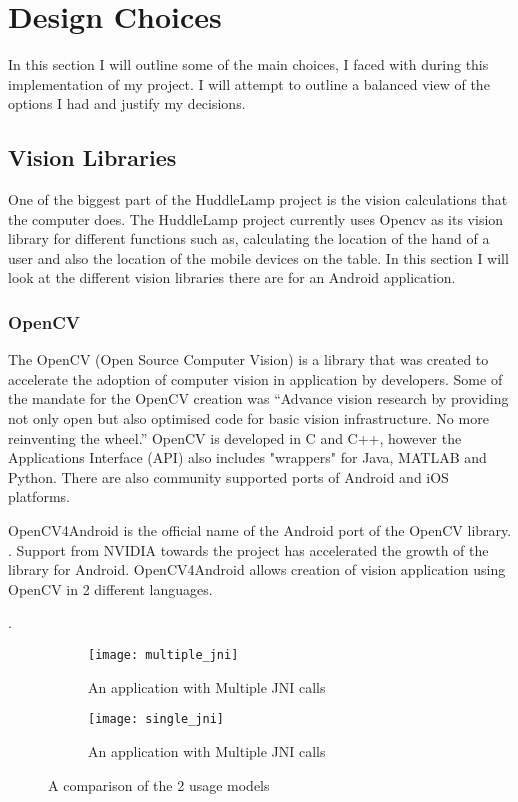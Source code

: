 
 
\section{Design Choices} \label{design_choice_android_camera}
In this section I will outline some of the main choices, I faced with during this implementation of my project. I will attempt to outline a balanced view of the options I had and justify my decisions.
 
\subsection{Vision Libraries}
One of the biggest part of the HuddleLamp project is the vision calculations that the computer does. The HuddleLamp project currently uses Opencv as its vision library for different functions such as, calculating the location of the hand of a user and also the location of the mobile devices on the table. In this section I will look at the different vision libraries there are for an Android application.
 
\subsubsection{OpenCV}
The OpenCV (Open Source Computer Vision) is a library that was created to accelerate the adoption of computer vision in application by developers. Some of the mandate for the OpenCV creation was “Advance vision research by providing not only open but also optimised code for basic vision infrastructure. No more reinventing the wheel.”
\cite{opencv_wiki} 
OpenCV is developed in C and C++, however the Applications Interface (API) also includes "wrappers" for Java, MATLAB and Python. There are also community supported ports of Android and iOS platforms.

OpenCV4Android is the official name of the Android port of the OpenCV library. 
\cite{opencv4android_link}. 
Support from NVIDIA towards the project has accelerated the growth of the library for Android. OpenCV4Android allows creation of vision application using OpenCV in 2  different languages.

\cite{opencv_usage_model}. 
\begin{figure}[H]
    \centering
    \begin{subfigure}[b]{0.47\textwidth}
        \centering
        \texttt{[image: multiple\_jni]}
        \caption{An application with Multiple JNI calls}
    \end{subfigure}
    \hfill
    \begin{subfigure}[b]{0.47\textwidth}
        \centering
        \texttt{[image: single\_jni]}
        \caption{An application with Multiple JNI calls}
    \end{subfigure}
    \hfill
    \caption{A comparison of the 2 usage models\cite{opencv_jni_images}}
     \label{two_usage_models}
\end{figure}

